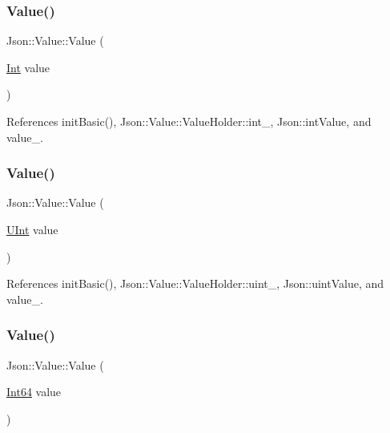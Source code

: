 \subsubsection{\texorpdfstring{Value()}{Value()}\hspace{0.1cm}{\footnotesize\ttfamily [2/12]}}
{\footnotesize\ttfamily Json\+::\+Value\+::\+Value (\begin{DoxyParamCaption}\item[{\hyperlink{classJson_1_1Value_abdf7a7ff73eb130ffcab28504ffdb405_abdf7a7ff73eb130ffcab28504ffdb405}{Int}}]{value }\end{DoxyParamCaption})}



References init\+Basic(), Json\+::\+Value\+::\+Value\+Holder\+::int\+\_\+, Json\+::int\+Value, and value\+\_\+.

\mbox{\label{classJson_1_1Value_ae67a857b01286e3499a87e95be848d20_ae67a857b01286e3499a87e95be848d20}} 
\subsubsection{\texorpdfstring{Value()}{Value()}\hspace{0.1cm}{\footnotesize\ttfamily [3/12]}}
{\footnotesize\ttfamily Json\+::\+Value\+::\+Value (\begin{DoxyParamCaption}\item[{\hyperlink{classJson_1_1Value_a0933d59b45793ae4aade1757c322a98d_a0933d59b45793ae4aade1757c322a98d}{U\+Int}}]{value }\end{DoxyParamCaption})}



References init\+Basic(), Json\+::\+Value\+::\+Value\+Holder\+::uint\+\_\+, Json\+::uint\+Value, and value\+\_\+.

\mbox{\label{classJson_1_1Value_ab1cdc3d9a4d4cc03fa01439d43ceb1b5_ab1cdc3d9a4d4cc03fa01439d43ceb1b5}} 
\subsubsection{\texorpdfstring{Value()}{Value()}\hspace{0.1cm}{\footnotesize\ttfamily [4/12]}}
{\footnotesize\ttfamily Json\+::\+Value\+::\+Value (\begin{DoxyParamCaption}\item[{\hyperlink{classJson_1_1Value_a1b86af9f85f0f1baa972c3319fa22695_a1b86af9f85f0f1baa972c3319fa22695}{Int64}}]{value }\end{DoxyParamCaption})}



